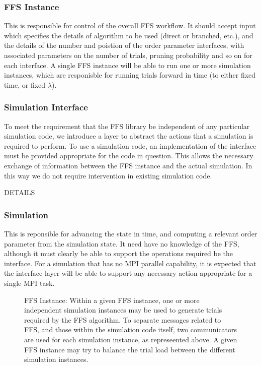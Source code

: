\documentclass[11pt]{article}
\begin{document}
\subsubsection{FFS Instance}


This is responsible for control of the overall FFS workflow. It should
accept input which specifies the details of algorithm to be used
(direct or branched, etc.), and the details of the number and poistion
of the order parameter interfaces, with associated parameters on the
number of trials, pruning probability and so on for each interface.
A single FFS instance will be able to run one or more simulation
instances, which are responisble for running trials forward in
time (to either fixed time, or fixed $\lambda$).


\subsubsection{Simulation Interface}

To meet the requirement that the FFS library be independent of
any particular simulation code, we introduce a layer to
abstract the actions that a simulation is required to perform.
To use a simulation code, an implementation of the interface
must be provided appropriate for the code in question. This
allows the necessary exchange of information between the FFS
instance and the actual simulation. In this way we do not require
intervention in existing simulation code.

DETAILS



\subsubsection{Simulation}

This is reponsible for advancing the state in time, and computing
a relevant order parameter from the simulation state. It need have
no knowledge of the FFS, although it must clearly be able to
support the operations required be the interface. For a simulation
that has no MPI parallel capability, it is expected that the
interface layer will be able to support any necessary action
appropriate for a single MPI task.



\begin{figure}[t]
\label{fig:instance}
\begin{center}

\end{center}
\caption{FFS Instance: Within a given FFS instance, one or more independent
simulation instances may be used to generate trials required by the FFS
algorithm. To separate messages related to FFS, and those within the
simulation code itself, two communicators are used for each simulation
instance, as represeented above. A given FFS instance may try to balance
the trial load between the different simulation instances.}
\end{figure}
\end{document}
